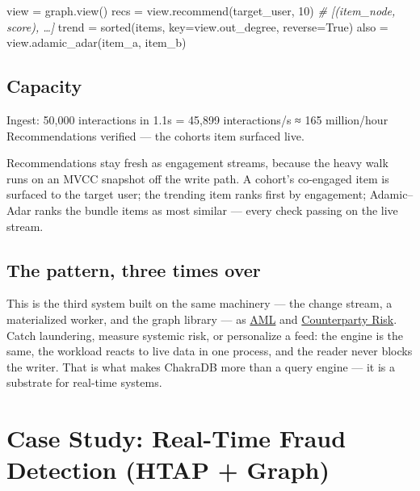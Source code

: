 \documentclass[
  11pt,
  openany]{book}
\newenvironment{Shaded}{}{}
\newcommand{\BuiltInTok}[1]{\textcolor[rgb]{0.00,0.50,0.00}{#1}}
\newcommand{\CommentTok}[1]{\textcolor[rgb]{0.38,0.63,0.69}{\textit{#1}}}
\newcommand{\DecValTok}[1]{\textcolor[rgb]{0.25,0.63,0.44}{#1}}
\newcommand{\NormalTok}[1]{#1}
\newcommand{\OperatorTok}[1]{\textcolor[rgb]{0.40,0.40,0.40}{#1}}
\newcommand{\VariableTok}[1]{\textcolor[rgb]{0.10,0.09,0.49}{#1}}
\begin{document}
\begin{Shaded}
\begin{Highlighting}[]
\NormalTok{view }\OperatorTok{=}\NormalTok{ graph.view()}
\NormalTok{recs   }\OperatorTok{=}\NormalTok{ view.recommend(target\_user, }\DecValTok{10}\NormalTok{)      }\CommentTok{\# [(item\_node, score), …]}
\NormalTok{trend  }\OperatorTok{=} \BuiltInTok{sorted}\NormalTok{(items, key}\OperatorTok{=}\NormalTok{view.out\_degree, reverse}\OperatorTok{=}\VariableTok{True}\NormalTok{)}
\NormalTok{also   }\OperatorTok{=}\NormalTok{ view.adamic\_adar(item\_a, item\_b)}
\end{Highlighting}
\end{Shaded}

\section{Capacity}\label{capacity-1}

\begin{Shaded}
\begin{Highlighting}[]
\NormalTok{Ingest: 50,000 interactions in 1.1s}
\NormalTok{        = 45,899 interactions/s  ≈  165 million/hour}
\NormalTok{Recommendations verified — the cohort\textquotesingle{}s item surfaced live.}
\end{Highlighting}
\end{Shaded}

Recommendations stay fresh as engagement streams, because the heavy walk
runs on an MVCC snapshot off the write path. A cohort's co-engaged item
is surfaced to the target user; the trending item ranks first by
engagement; Adamic--Adar ranks the bundle items as most similar ---
every check passing on the live stream.

\section{The pattern, three times
over}\label{the-pattern-three-times-over}

This is the third system built on the same machinery --- the change
stream, a materialized worker, and the graph library --- as
\href{aml.md}{AML} and \href{ccr.md}{Counterparty Risk}. Catch
laundering, measure systemic risk, or personalize a feed: the engine is
the same, the workload reacts to live data in one process, and the
reader never blocks the writer. That is what makes ChakraDB more than a
query engine --- it is a substrate for real-time systems.

\chapter{Case Study: Real-Time Fraud Detection (HTAP +
Graph)}\label{case-study-real-time-fraud-detection-htap-graph}
\end{document}
